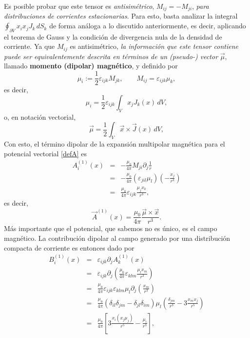 Es posible probar que este tensor es \textit{antisimétrico},
$M_{ij}=-M_{ji}$, \textit{para distribuciones de corrientes estacionarias}. Para esto,
basta analizar la integral $\oint_{\partial V}x_i x_j J_k\,dS_k$ de forma
análoga a lo discutido anteriormente, es decir, aplicando el teorema de Gauss y la
condición de divergencia nula de la densidad de corriente. Ya que $M_{ij}$ es
antisimétrico, \textit{la información que este tensor contiene puede ser
equivalentemente descrita en términos de un (pseudo-) vector} $\vec{\mu}$,
llamado \textbf{momento (dipolar) magnético}, y definido por
\begin{equation}
 \mu_i:=\frac{1}{2}\varepsilon_{ijk}M_{jk}, \qquad
M_{ij}=\varepsilon_{ijk}\mu_k, \label{vmdm}
\end{equation}
es decir,
\begin{equation}
 \boxed{\mu_i=\frac{1}{2}\varepsilon_{ijk}\int_V x_j J_k(x)\, dV,}
\end{equation}
o, en notación vectorial, 
\begin{equation}
 \boxed{\vec{\mu}=\frac{1}{2}\int_V \vec{x}\times\vec{J}(x)\,dV,}
\end{equation}
Con esto, el término dipolar de la expansión multipolar magnética para el
potencial vectorial \eqref{defA} es
\begin{eqnarray}
 A_i^{(1)}(x)&=&-\frac{\mu_0}{4\pi}M_{ji}\partial_j\frac{1}{r} \\
&=&-\frac{\mu_0}{4\pi}\left(\varepsilon_{jil}\mu_l\right)\left(-\frac{x_j}{
r^3}\right) \\
&=&\frac{\mu_0}{4\pi}\varepsilon_{ijk}\frac{\mu_jx_k}{r^3},
\end{eqnarray}
es decir,
\begin{equation}
 \boxed{\vec{A}^{(1)}(x)=\frac{\mu_0}{4\pi}\frac{\vec{\mu}\times\vec{x}}{r^3}.}
\label{Adip}
\end{equation}
Más importante que el potencial, que sabemos no es único, es el campo
magnético. La contribución dipolar al campo generado por una distribución
compacta de corriente es entonces dado por
\begin{eqnarray}
B_i^{(1)}(x)&=&\varepsilon_{ijk}\partial_jA_k^{(1)}(x)\\
&=&\varepsilon_{ijk}\partial_j\left(\frac{\mu_0}{4\pi}\varepsilon_{klm}\frac{
\mu_lx_m}{r^3}\right) \\
&=&\frac{\mu_0}{4\pi}\varepsilon_{ijk}\varepsilon_{klm}\mu_l\partial_j\left(
\frac{x_m}{r^3}\right) \\
&=&\frac{\mu_0}{4\pi}\left(\delta_{il}\delta_{jm}-\delta_{jl}\delta_{im}\right)
\mu_l\left(\frac{\delta_{jm}}{r^3}-3\frac{x_mx_j}{r^5}\right) \\
&=&\frac{\mu_0}{4\pi}\left[3\frac{x_i(x_j\mu_j)}{r^5}-\frac{\mu_i}{r^3}
\right] ,
\end{eqnarray}
